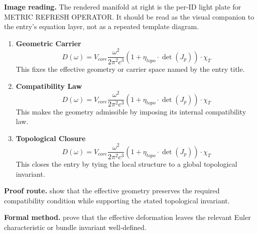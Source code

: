 \begin{samepage}
\noindent\begin{minipage}[t]{0.45\linewidth}
\vspace{0pt}
\raggedright
\scriptsize\textbf{Image reading.} The rendered manifold at right is the per-ID light plate for METRIC REFRESH OPERATOR. It should be read as the visual companion to the entry's equation layer, not as a repeated template diagram.\par
\end{minipage}\hfill
\begin{minipage}[t]{0.53\linewidth}
\vspace*{-0.10in}
\raggedright
{}
\end{minipage}
\end{samepage}

\clearpage


\begin{enumerate}[leftmargin=1.6em,itemsep=9pt,topsep=6pt]
\item \textbf{Geometric Carrier}
\[
D(\omega) = V_{core} \frac{\omega^2}{2\pi^2 c^3} (1 + \eta_{topo} \cdot \det(J_p)) \cdot \chi_T
\]
This fixes the effective geometry or carrier space named by the entry title.

\item \textbf{Compatibility Law}
\[
D(\omega) = V_{core} \frac{\omega^2}{2\pi^2 c^3} (1 + \eta_{topo} \cdot \det(J_p)) \cdot \chi_T
\]
This makes the geometry admissible by imposing its internal compatibility law.

\item \textbf{Topological Closure}
\[
D(\omega) = V_{core} \frac{\omega^2}{2\pi^2 c^3} (1 + \eta_{topo} \cdot \det(J_p)) \cdot \chi_T
\]
This closes the entry by tying the local structure to a global topological invariant.
\end{enumerate}

\textbf{Proof route.} show that the effective geometry preserves the required compatibility condition while supporting the stated topological invariant.

\textbf{Formal method.} prove that the effective deformation leaves the relevant Euler characteristic or bundle invariant well-defined.

\medskip
{}

